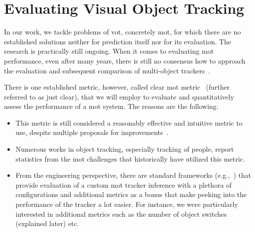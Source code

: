 \section{Evaluating Visual Object Tracking}
\label{sec:EvaluatingVisualObjectTracking}

In our work, we tackle problems of \Gls{vot}, concretely \gls{mot}, for which there are no established solutions neither for prediction itself nor for its evaluation. The research is practically still ongoing. When it comes to evaluating \gls{mot} performance, even after many years, there is still no consensus how to approach the evaluation and subsequent comparison of multi-object trackers~\cite{Bernardin2008}.

There is one established metric, however, called \gls{clear} \gls{mot} metric~\cite{Bernardin2008} (further referred to as just \gls{clear}), that we will employ to evaluate and quantitatively assess the performance of a \gls{mot} system. The reasons are the following:
\begin{itemize}
    \item This metric is still considered a reasonably effective and intuitive metric to use, despite multiple proposals for improvements~\cite{CVIU_UA-DETRAC}.
    \item Numerous works in object tracking, especially tracking of people, report statistics from the \gls{mot} challenges that historically have utilized this metric.
    \item From the engineering perspective, there are standard frameworks (e.g.,~\cite{pymotmetrics}) that provide evaluation of a custom \gls{mot} tracker inference with a plethora of configurations and additional metrics as a bonus that make peeking into the performance of the tracker a lot easier. For instance, we were particularly interested in additional metrics such as the number of object switches (explained later) etc.
\end{itemize}

